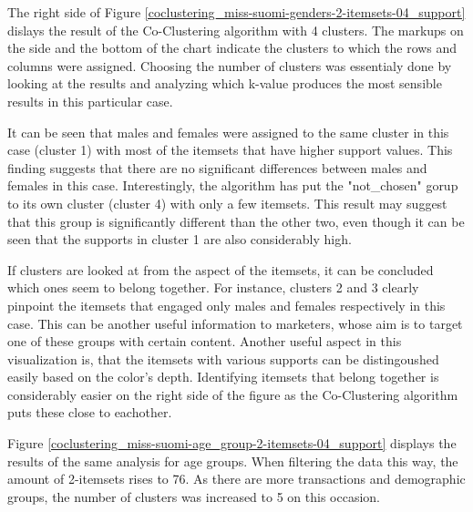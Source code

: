 The right side of Figure \ref{coclustering_miss-suomi-genders-2-itemsets-04_support} dislays the result of the Co-Clustering algorithm with 4 clusters. The markups on the side and the bottom of the chart indicate the clusters to which the rows and columns were assigned. Choosing the number of clusters was essentialy done by looking at the results and analyzing which k-value produces the most sensible results in this particular case. 

It can be seen that males and females were assigned to the same cluster in this case (cluster 1) with most of the itemsets that have higher support values. This finding suggests that there are no significant differences between males and females in this case. Interestingly, the algorithm has put the "not\_chosen" gorup to its own cluster (cluster 4) with only a few itemsets. This result may suggest that this group is significantly different than the other two, even though it can be seen that the supports in cluster 1 are also considerably high. 

If clusters are looked at from the aspect of the itemsets, it can be concluded which ones seem to belong together. For instance, clusters 2 and 3 clearly pinpoint the itemsets that engaged only males and females respectively in this case. This can be another useful information to marketers, whose aim is to target one of these groups with certain content. Another useful aspect in this visualization is, that the itemsets with various supports can be distingoushed easily based on the color's depth. Identifying itemsets that belong together is considerably easier on the right side of the figure as the Co-Clustering algorithm puts these close to eachother. 

Figure \ref{coclustering_miss-suomi-age_group-2-itemsets-04_support} displays the results of the same analysis for age groups. When filtering the data this way, the amount of 2-itemsets rises to 76. As there are more transactions and demographic groups, the number of clusters was increased to 5 on this occasion. 

